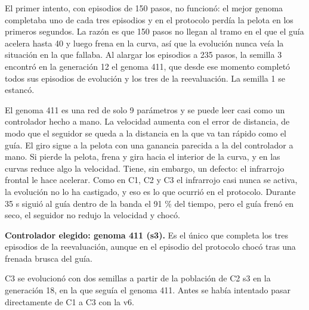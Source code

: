 \documentclass[11pt,a4paper]{article}
\makeatletter
\renewcommand\subsection{\@startsection{subsection}{2}{\z@}{-1.5ex plus -0.3ex}{0.6ex}{\normalfont\normalsize\bfseries}}
\makeatother
\begin{document}
El primer intento, con episodios de 150 pasos, no funcionó: el mejor genoma completaba uno de cada tres
episodios y en el protocolo perdía la pelota en los primeros segundos. La razón es que 150 pasos no llegan al
tramo en el que el guía acelera hasta 40 y luego frena en la curva, así que la evolución nunca veía la situación
en la que fallaba. Al alargar los episodios a 235 pasos, la semilla 3 encontró en la generación 12 el genoma
411, que desde ese momento completó todos sus episodios de evolución y los tres de la reevaluación. La semilla 1
se estancó.

El genoma 411 es una red de solo 9 parámetros y se puede leer casi como un controlador hecho a mano. La
velocidad aumenta con el error de distancia, de modo que el seguidor se queda a la distancia en la que va tan
rápido como el guía. El giro sigue a la pelota con una ganancia parecida a la del controlador a mano. Si pierde
la pelota, frena y gira hacia el interior de la curva, y en las curvas reduce algo la velocidad. Tiene, sin
embargo, un defecto: el infrarrojo frontal le hace acelerar. Como en C1, C2 y C3 el infrarrojo casi nunca se
activa, la evolución no lo ha castigado, y eso es lo que ocurrió en el protocolo. Durante 35 s siguió al guía
dentro de la banda el 91 \% del tiempo, pero el guía frenó en seco, el seguidor no redujo la velocidad y chocó.

\textbf{Controlador elegido: genoma 411 (s3).} Es el único que completa los tres episodios de la reevaluación,
aunque en el episodio del protocolo chocó tras una frenada brusca del guía.

\subsection{C3: variable 10-40}

C3 se evolucionó con dos semillas a partir de la población de C2 s3 en la generación 18, en la que seguía el
genoma 411. Antes se había intentado pasar directamente de C1 a C3 con la v6.
\end{document}
